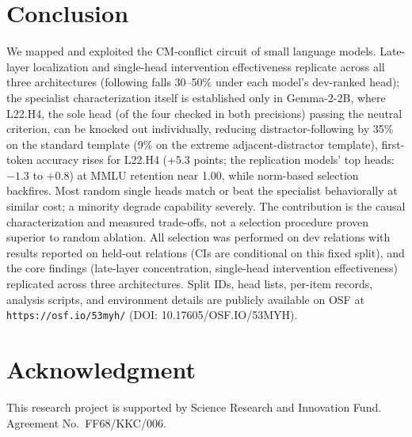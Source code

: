 \documentclass[paper]{ieice}
\newcommand{\emodel}{Gemma-2-2B}
\newcommand{\spec}{L22.H4}
\begin{document}
\section{Conclusion}
\label{sec:conclusion}

We mapped and exploited the CM-conflict circuit of small language
models. Late-layer localization and single-head intervention
effectiveness replicate across all three architectures (following
falls 30--50\% under each model's dev-ranked head); the specialist
characterization itself is established only in \emodel{}, where
L22.H4, the sole head (of the four checked in both precisions)
passing the neutral criterion, can be knocked out individually, reducing
distractor-following by 35\% on the standard template (9\% on the
extreme adjacent-distractor template),
first-token accuracy rises for \spec{} (+5.3 points; the
replication models' top heads: $-1.3$ to $+0.8$) at MMLU retention
near 1.00, while norm-based selection backfires. Most random single heads
match or beat the specialist behaviorally at similar cost; a minority
degrade capability severely. The contribution is the causal
characterization and measured trade-offs, not a selection procedure
proven superior to random ablation. All selection was
performed on dev relations with results reported on held-out
relations (CIs are conditional on this fixed split),
and the core findings (late-layer concentration, single-head
intervention effectiveness) replicated across three architectures.
Split IDs, head lists, per-item records, analysis scripts, and
environment details are publicly available on OSF at
\texttt{https://osf.io/53myh/} (DOI: 10.17605/OSF.IO/53MYH).

\section*{Acknowledgment}
This research project is supported by Science Research and Innovation
Fund. Agreement No.\ FF68/KKC/006.
\end{document}

